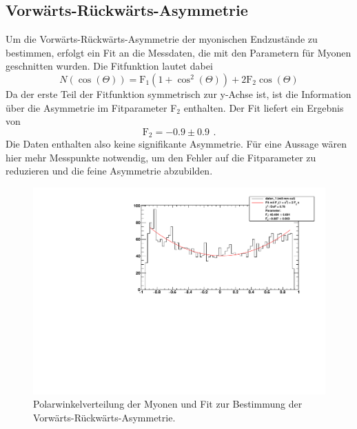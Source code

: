\subsection{Vorwärts-Rückwärts-Asymmetrie}
Um die Vorwärts-Rückwärts-Asymmetrie der myonischen Endzustände zu bestimmen,
erfolgt ein Fit an die Messdaten, die mit den Parametern für Myonen geschnitten wurden.
Die Fitfunktion lautet dabei
\begin{equation}
  N(\cos(\Theta))=\text{F}_1 \left (1+\cos^2(\Theta) \right) + 2 \text{F}_2\cos(\Theta)
\end{equation}
Da der erste Teil der Fitfunktion symmetrisch zur y-Achse ist,
ist die Information über die Asymmetrie im Fitparameter F$_2$ enthalten.
Der Fit liefert ein Ergebnis von
\begin{equation}
  \text{F}_2=-0.9 \pm 0.9 \ \, .
\end{equation}
Die Daten enthalten also keine signifikante Asymmetrie.
Für eine Aussage wären hier mehr Messpunkte notwendig,
um den Fehler auf die Fitparameter zu reduzieren und die feine Asymmetrie abzubilden.

\begin{figure}[H]
\begin{center}
  \includegraphics[width=\textwidth]{../img/FBA_91-23223.pdf}
  \caption{Polarwinkelverteilung der Myonen und Fit zur Bestimmung der Vorwärts-Rückwärts-Asymmetrie.}
  \label{img:FBA}
\end{center}
\end{figure}

